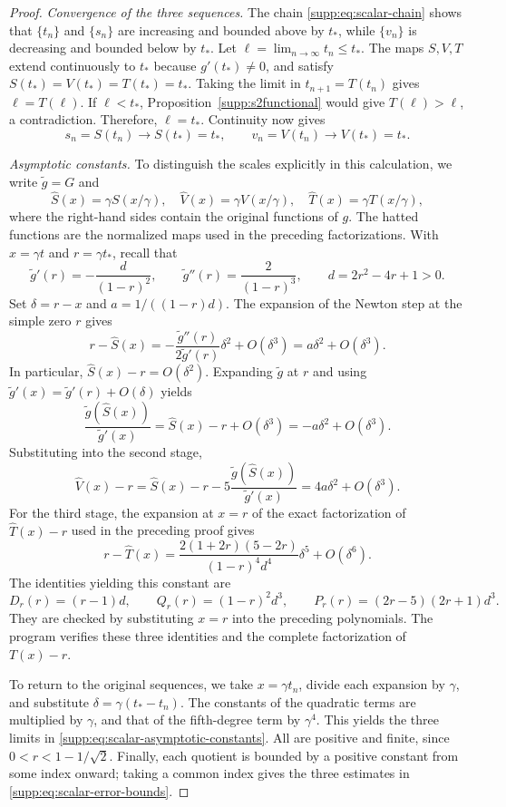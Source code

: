 \documentclass[11pt,a4paper]{article}
\numberwithin{equation}{section}
\numberwithin{table}{section}
\theoremstyle{plain}
\theoremstyle{definition}\newtheorem{definition}[theorem]{Definition}
\theoremstyle{remark}\newtheorem{remark}[theorem]{Remark}
\begin{document}
\begin{proof}
\textit{Convergence of the three sequences.}
The chain \eqref{supp:eq:scalar-chain} shows that $\{t_n\}$ and
$\{s_n\}$ are increasing and bounded above by $t_*$, while $\{v_n\}$
is decreasing and bounded below by $t_*$. Let
$\ell=\lim_{n\to\infty}t_n\leq t_*$. The maps $S,V,T$ extend
continuously to $t_*$ because $g'(t_*)\neq0$, and satisfy
$S(t_*)=V(t_*)=T(t_*)=t_*$. Taking the limit in $t_{n+1}=T(t_n)$
gives $\ell=T(\ell)$. If $\ell<t_*$,
Proposition~\ref{supp:s2functional} would give $T(\ell)>\ell$,
a contradiction. Therefore, $\ell=t_*$. Continuity now gives
\[
 s_n=S(t_n)\longrightarrow S(t_*)=t_*,\qquad
 v_n=V(t_n)\longrightarrow V(t_*)=t_*.
\]

\textit{Asymptotic constants.}
To distinguish the scales explicitly in this calculation, we write
$\widetilde g=G$ and
\[
 \widehat S(x)=\gamma S(x/\gamma),\quad
 \widehat V(x)=\gamma V(x/\gamma),\quad
 \widehat T(x)=\gamma T(x/\gamma),
\]
where the right-hand sides contain the original functions of $g$.
The hatted functions are the normalized maps used in the preceding
factorizations. With $x=\gamma t$ and $r=\gamma t_*$, recall that
\[
 \widetilde g'(r)=-\frac{d}{(1-r)^2},\qquad
 \widetilde g''(r)=\frac{2}{(1-r)^3},\qquad d=2r^2-4r+1>0.
\]
Set $\delta=r-x$ and $a=1/((1-r)d)$. The expansion of the Newton step
at the simple zero $r$ gives
\[
 r-\widehat S(x)
 =-\frac{\widetilde g''(r)}{2\widetilde g'(r)}\delta^2
   +O(\delta^3)
 =a\delta^2+O(\delta^3).
\]
In particular, $\widehat S(x)-r=O(\delta^2)$. Expanding $\widetilde g$
at $r$ and using $\widetilde g'(x)=\widetilde g'(r)+O(\delta)$ yields
\[
 \frac{\widetilde g(\widehat S(x))}{\widetilde g'(x)}
 =\widehat S(x)-r+O(\delta^3)
 =-a\delta^2+O(\delta^3).
\]
Substituting into the second stage,
\[
 \widehat V(x)-r
 =\widehat S(x)-r
   -5\frac{\widetilde g(\widehat S(x))}{\widetilde g'(x)}
 =4a\delta^2+O(\delta^3).
\]
For the third stage, the expansion at $x=r$ of the exact factorization
of $\widehat T(x)-r$ used in the preceding proof gives
\[
 r-\widehat T(x)
 =\frac{2(1+2r)(5-2r)}{(1-r)^4d^4}\delta^5+O(\delta^6).
\]
The identities yielding this constant are
\[
 D_r(r)=(r-1)d,\qquad Q_r(r)=(1-r)^2d^3,\qquad
 P_r(r)=(2r-5)(2r+1)d^3.
\]
They are checked by substituting $x=r$ into the preceding polynomials.
The program  verifies
these three identities and the complete factorization of $T(x)-r$.

To return to the original sequences, we take $x=\gamma t_n$, divide
each expansion by $\gamma$, and substitute $\delta=\gamma(t_*-t_n)$.
The constants of the quadratic terms are multiplied by $\gamma$, and
that of the fifth-degree term by $\gamma^4$. This yields the three
limits in \eqref{supp:eq:scalar-asymptotic-constants}. All are positive
and finite, since $0<r<1-1/\sqrt2$. Finally, each quotient is bounded
by a positive constant from some index onward; taking a common index
gives the three estimates in \eqref{supp:eq:scalar-error-bounds}.
\end{proof}
\end{document}
